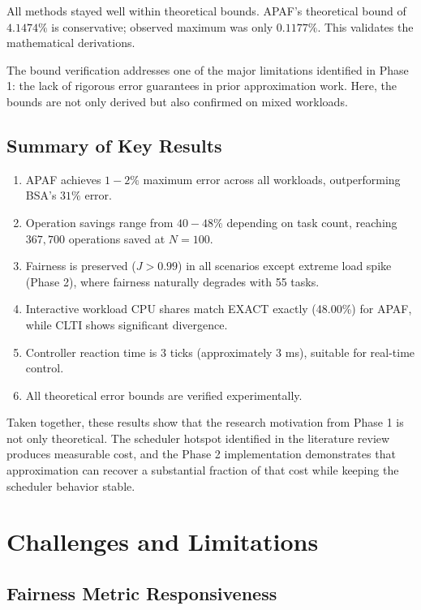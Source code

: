 \documentclass[conference]{IEEEtran}
\begin{document}
All methods stayed well within theoretical bounds. APAF's theoretical bound of $4.1474\%$ is conservative; observed maximum was only $0.1177\%$. This validates the mathematical derivations.

The bound verification addresses one of the major limitations identified in Phase 1: the lack of rigorous error guarantees in prior approximation work. Here, the bounds are not only derived but also confirmed on mixed workloads.

\subsection{Summary of Key Results}

\begin{enumerate}
\item APAF achieves $1-2\%$ maximum error across all workloads, outperforming BSA's $31\%$ error.
\item Operation savings range from $40-48\%$ depending on task count, reaching $367{,}700$ operations saved at $N=100$.
\item Fairness is preserved ($J > 0.99$) in all scenarios except extreme load spike (Phase 2), where fairness naturally degrades with 55 tasks.
\item Interactive workload CPU shares match EXACT exactly (48.00\%) for APAF, while CLTI shows significant divergence.
\item Controller reaction time is $3$ ticks (approximately $3$ ms), suitable for real-time control.
\item All theoretical error bounds are verified experimentally.
\end{enumerate}

Taken together, these results show that the research motivation from Phase 1 is not only theoretical. The scheduler hotspot identified in the literature review produces measurable cost, and the Phase 2 implementation demonstrates that approximation can recover a substantial fraction of that cost while keeping the scheduler behavior stable.

\section{Challenges and Limitations}\label{sec:challenges}

\subsection{Fairness Metric Responsiveness}
\end{document}
